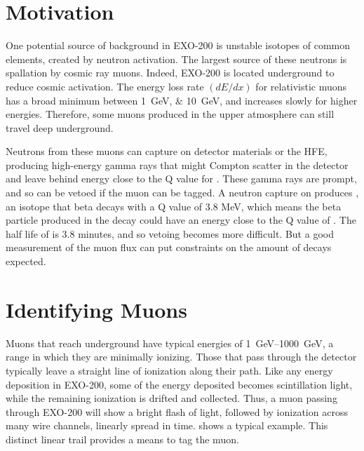 \documentclass[herrin-thesis.tex]{subfiles}
\begin{document}
\section{Motivation}
\label{sec:muon:motivation}
One potential source of background in EXO-200 is unstable isotopes of common elements, created by neutron activation. The largest source of these neutrons is spallation by cosmic ray muons. Indeed, EXO-200 is located underground to reduce cosmic activation. The energy loss rate \((d E/d x)\) for relativistic muons has a broad minimum between \SIlist{1;10}{\GeV}, and increases slowly for higher energies. Therefore, some muons produced in the upper atmosphere can still travel deep underground.

Neutrons from these muons can capture on detector materials or the HFE, producing high-energy gamma rays that might Compton scatter in the detector and leave behind energy close to the Q value for . These gamma rays are prompt, and so can be vetoed if the muon can be tagged. A neutron capture on  produces , an isotope that beta decays with a Q value of 3.8 MeV, which means the beta particle produced in the decay could have an energy close to the Q value of . The half life of  is 3.8 minutes, and so vetoing becomes more difficult. But a good measurement of the muon flux can put constraints on the amount of  decays expected.

\section{Identifying Muons}
\label{sec:muon:id}
Muons that reach underground have typical energies of \SIrange{1}{1000}{\GeV}, a range in which they are minimally ionizing. Those that pass through the detector typically leave a straight line of ionization along their path. Like any energy deposition in EXO-200, some of the energy deposited becomes scintillation light, while the remaining ionization is drifted and collected. Thus, a muon passing through EXO-200 will show a bright flash of light, followed by ionization across many wire channels, linearly spread in time.  shows a typical example. This distinct linear trail provides a means to tag the muon.
\end{document}
